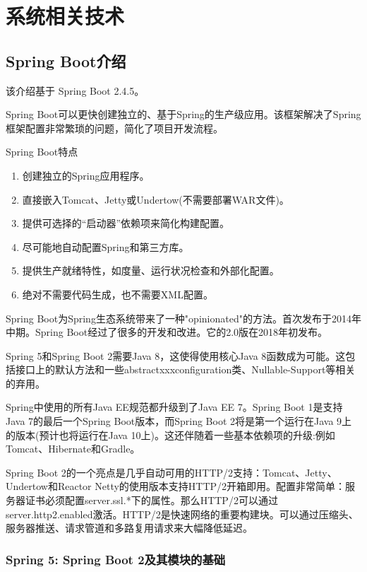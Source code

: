 
\chapter{系统相关技术}
\label{系统相关技术}

\section{Spring Boot介绍}

该介绍基于 Spring Boot 2.4.5。

Spring Boot可以更快创建独立的、基于Spring的生产级应用。该框架解决了Spring框架配置非常繁琐的问题，简化了项目开发流程\cite{.2019f}。

Spring Boot特点

\begin{enumerate}
  \item 创建独立的Spring应用程序。
  \item 直接嵌入Tomcat、Jetty或Undertow(不需要部署WAR文件)。
  \item 提供可选择的“启动器”依赖项来简化构建配置。
  \item 尽可能地自动配置Spring和第三方库。
  \item 提供生产就绪特性，如度量、运行状况检查和外部化配置。
  \item 绝对不需要代码生成，也不需要XML配置。
\end{enumerate}

Spring Boot为Spring生态系统带来了一种"opinionated"的方法。首次发布于2014年中期。Spring Boot经过了很多的开发和改进。它的2.0版在2018年初发布。

Spring 5和Spring Boot 2需要Java 8，这使得使用核心Java 8函数成为可能。这包括接口上的默认方法和一些abstractxxxconfiguration类、Nullable-Support等相关的弃用。

Spring中使用的所有Java EE规范都升级到了Java EE 7。Spring Boot 1是支持Java 7的最后一个Spring Boot版本，而Spring Boot 2将是第一个运行在Java 9上的版本(预计也将运行在Java 10上)。这还伴随着一些基本依赖项的升级:例如Tomcat、Hibernate和Gradle。

Spring Boot 2的一个亮点是几乎自动可用的HTTP/2支持：Tomcat、Jetty、Undertow和Reactor Netty的使用版本支持HTTP/2开箱即用。配置非常简单：服务器证书必须配置server.ssl.*下的属性。那么HTTP/2可以通过server.http2.enabled激活。HTTP/2是快速网络的重要构建块。可以通过压缩头、服务器推送、请求管道和多路复用请求来大幅降低延迟。

\subsection{Spring 5: Spring Boot 2及其模块的基础}

